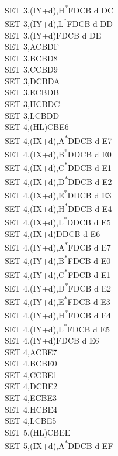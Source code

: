 \documentclass[twoside,openright,a4paper]{book}
\begin{document}
\begin{multicols}{3}
{\begin{tabbing}
	SET 3,(IY+d),H\textsuperscript{*}\>FDCB d DC\\
	SET 3,(IY+d),L\textsuperscript{*}\>FDCB d DD\\
	SET 3,(IY+d)\>FDCB d DE\\
	SET 3,A\>CBDF\\
	SET 3,B\>CBD8\\
	SET 3,C\>CBD9\\
	SET 3,D\>CBDA\\
	SET 3,E\>CBDB\\
	SET 3,H\>CBDC\\
	SET 3,L\>CBDD\\
	SET 4,(HL)\>CBE6\\
	SET 4,(IX+d),A\textsuperscript{*}\>DDCB d E7\\
	SET 4,(IX+d),B\textsuperscript{*}\>DDCB d E0\\
	SET 4,(IX+d),C\textsuperscript{*}\>DDCB d E1\\
	SET 4,(IX+d),D\textsuperscript{*}\>DDCB d E2\\
	SET 4,(IX+d),E\textsuperscript{*}\>DDCB d E3\\
	SET 4,(IX+d),H\textsuperscript{*}\>DDCB d E4\\
	SET 4,(IX+d),L\textsuperscript{*}\>DDCB d E5\\
	SET 4,(IX+d)\>DDCB d E6\\
	SET 4,(IY+d),A\textsuperscript{*}\>FDCB d E7\\
	SET 4,(IY+d),B\textsuperscript{*}\>FDCB d E0\\
	SET 4,(IY+d),C\textsuperscript{*}\>FDCB d E1\\
	SET 4,(IY+d),D\textsuperscript{*}\>FDCB d E2\\
	SET 4,(IY+d),E\textsuperscript{*}\>FDCB d E3\\
	SET 4,(IY+d),H\textsuperscript{*}\>FDCB d E4\\
	SET 4,(IY+d),L\textsuperscript{*}\>FDCB d E5\\
	SET 4,(IY+d)\>FDCB d E6\\
	SET 4,A\>CBE7\\
	SET 4,B\>CBE0\\
	SET 4,C\>CBE1\\
	SET 4,D\>CBE2\\
	SET 4,E\>CBE3\\
	SET 4,H\>CBE4\\
	SET 4,L\>CBE5\\
	SET 5,(HL)\>CBEE\\
	SET 5,(IX+d),A\textsuperscript{*}\>DDCB d EF\\

\end{tabbing}}
\end{multicols}
\end{document}
